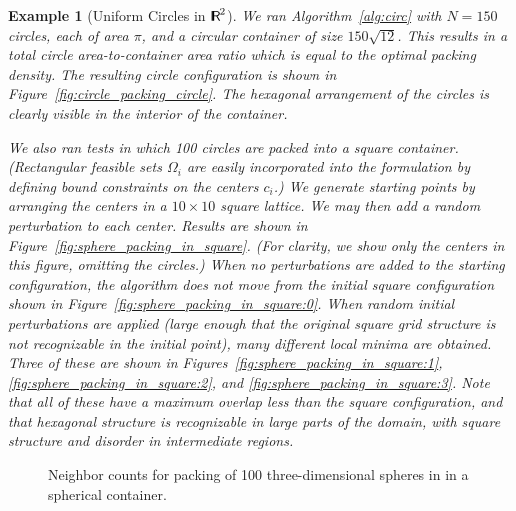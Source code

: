\documentclass{siamltex}
\newtheorem{Exa}{Example}[section]
\begin{document}
\begin{Exa}[Uniform Circles in ${\makebox{\sf I \hspace{-8.5 pt} R \hspace{-4.0pt}}}^2$] \label{ex:circles}
  We ran Algorithm~\ref{alg:circ} with $N=150$ circles, each of area
  $\pi$, and a circular container of size $150\sqrt{12}$. This results
  in a total circle area-to-container area ratio which is equal to the
  optimal packing density. The resulting circle configuration is shown
  in Figure~\ref{fig:circle_packing_circle}. The hexagonal arrangement of the
  circles is clearly visible in the interior of the container.

  We also ran tests in which 100 circles are packed into a square
  container. (Rectangular feasible sets $\Omega_i$ are easily
  incorporated into the formulation by defining bound constraints on
  the centers $c_i$.) We generate starting points by arranging the
  centers in a $10 \times 10$ square lattice. We may then add a random
  perturbation to each center.  Results are shown in
  Figure~\ref{fig:sphere_packing_in_square}.  (For clarity, we show
  only the centers in this figure, omitting the circles.) When no
  perturbations are added to the starting configuration, the algorithm
  does not move from the initial square configuration shown in
  Figure~\ref{fig:sphere_packing_in_square:0}. When random initial
  perturbations are applied (large enough that the original square
  grid structure is not recognizable in the initial point), many
  different local minima are obtained. Three of these are shown in
  Figures~\ref{fig:sphere_packing_in_square:1},
  \ref{fig:sphere_packing_in_square:2}, and
  \ref{fig:sphere_packing_in_square:3}.  Note that all of these have a
  maximum overlap less than the square configuration, and that
  hexagonal structure is recognizable in large parts of the domain,
  with square structure and disorder in intermediate regions.
\end{Exa}

\begin{figure}[!b]
  \centering {}
  \;
\caption{Neighbor counts for packing of 100 three-dimensional spheres in  in a spherical container.}
\label{fig:sphere_packing}
\end{figure}
\end{document}
